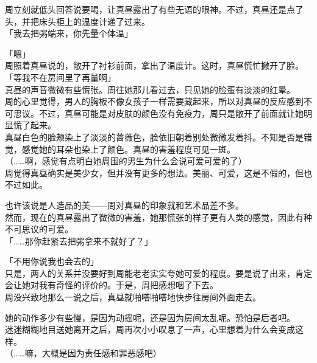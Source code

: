 周立刻就低头回答说要喝，让真昼露出了有些无语的眼神。不过，真昼还是点了头，并把床头柜上的温度计递了过来。\\

「我去把粥端来，你先量个体温」

「嗯」\\

周照着真昼说的，敞开了衬衫前面，拿出了温度计。这时，真昼慌忙撇开了脸。\\

「等我不在房间里了再量啊」\\

真昼的声音微微有些慌张。周往她那儿看过去，只见她的脸蛋有淡淡的红晕。\\

周的心里觉得，男人的胸板不像女孩子一样需要藏起来，所以对真昼的反应感到不可思议。不过，真昼可能是对皮肤的颜色没有免疫力，周只是敞开了前面就让她明显慌了起来。\\

真昼白色的脸颊染上了淡淡的蔷薇色，脸依旧朝着别处微微发着抖。不知是否是错觉，感觉她的耳朵也染上了颜色。真昼的害羞程度可见一斑。\\

（……啊，感觉有点明白她周围的男生为什么会说可爱可爱的了）\\

周觉得真昼确实是美少女，但并没有更多的想法。美丽、可爱，这是不假的，但也不过如此。

也许该说是人造品的美——周对真昼的印象就和艺术品差不多。\\

然而，现在的真昼露出了微微的害羞，她那慌张的样子更有人类的感觉，因此有种不可思议的可爱。\\

「……那你赶紧去把粥拿来不就好了？」

「不用你说我也会去的」\\

只是，两人的关系并没要好到周能老老实实夸她可爱的程度。要是说了出来，肯定会让她对我有奇怪的评价的。于是，周把感想咽了下去。\\

周没兴致地那么一说之后，真昼就啪嗒啪嗒地快步往房间外面走去。

她的动作多少有些慢，是因为动摇呢，还是因为房间太乱呢。恐怕是后者吧。\\

迷迷糊糊地目送她离开之后，周再次小小叹息了一声，心里想着为什么会变成这样。\\

（……嘛，大概是因为责任感和罪恶感吧）\\

